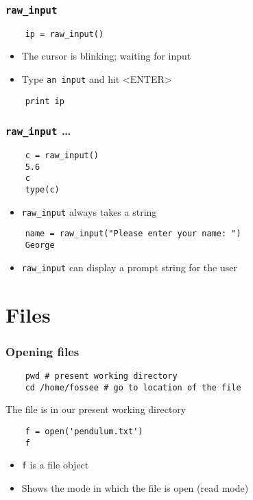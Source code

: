 \begin{frame}[fragile]
  \frametitle{\texttt{raw\_input}}
  \begin{lstlisting}
    ip = raw_input()    
  \end{lstlisting}
  \begin{itemize}
  \item The cursor is blinking; waiting for input
  \item Type \texttt{an input} and hit <ENTER>
  \end{itemize}
  \begin{lstlisting}
    print ip
  \end{lstlisting}
\end{frame}

\begin{frame}[fragile]
  \frametitle{\texttt{raw\_input} \ldots}
  \begin{lstlisting}
    c = raw_input()
    5.6
    c
    type(c)
  \end{lstlisting}
  \begin{itemize}
  \item \alert{\texttt{raw\_input} always takes a string}
  \end{itemize}
  \begin{lstlisting}
    name = raw_input("Please enter your name: ")
    George
  \end{lstlisting}
  \begin{itemize}
  \item \texttt{raw\_input} can display a prompt string for the user
  \end{itemize}
\end{frame}

\section{Files}

\begin{frame}[fragile]
  \frametitle{Opening files}
  \begin{lstlisting}
    pwd # present working directory
    cd /home/fossee # go to location of the file
  \end{lstlisting}
  {\tiny The file is in our present working directory}
  \begin{lstlisting}
    f = open('pendulum.txt')
    f
  \end{lstlisting}
  \begin{itemize}
  \item \texttt{f} is a file object
  \item Shows the mode in which the file is open (read mode)
  \end{itemize}
\end{frame}

